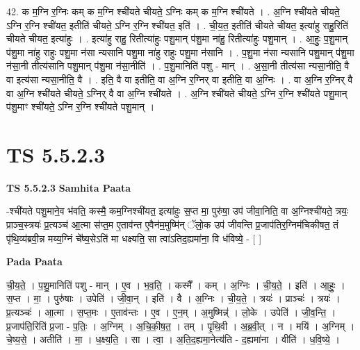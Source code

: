 \documentclass[17pt]{extarticle}
\begin{document}
42. क म॒ग्नि र॒ग्निः कम् क म॒ग्नि श्ची॑यते चीयते॒ ऽग्निः कम् क म॒ग्नि श्ची॑यते । . अ॒ग्नि श्ची॑यते चीयते॒ ऽग्नि र॒ग्नि श्ची॑यत॒ इतीति॑ चीयते॒ ऽग्नि र॒ग्नि श्ची॑यत॒ इति॑ । . ची॒य॒त॒ इतीति॑ चीयते चीयत॒ इत्या॑हु राहु॒रिति॑ चीयते चीयत॒ इत्या॑हुः । . इत्या॑हु राहु॒ रितीत्या॑हुः पशु॒मान् प॑शु॒मा ना॑हु॒ रितीत्या॑हुः पशु॒मान् । . आ॒हुः॒ प॒शु॒मान् प॑शु॒मा ना॑हु राहुः पशु॒मा न॑सा न्यसानि पशु॒मा ना॑हु राहुः पशु॒मा न॑सानि । . प॒शु॒मा न॑सा न्यसानि पशु॒मान् प॑शु॒मा न॑सा॒नी तीत्य॑सानि पशु॒मान् प॑शु॒मा न॑सा॒नीति॑ । . प॒शु॒मानिति॑ पशु - मान् । . अ॒सा॒नी तीत्य॑सा न्यसा॒नीति॒ वै वा इत्य॑सा न्यसा॒नीति॒ वै । . इति॒ वै वा इतीति॒ वा अ॒ग्नि र॒ग्निर् वा इतीति॒ वा अ॒ग्निः । . वा अ॒ग्नि र॒ग्निर् वै वा अ॒ग्नि श्ची॑यते चीयते॒ ऽग्निर् वै वा अ॒ग्नि श्ची॑यते । . अ॒ग्नि श्ची॑यते चीयते॒ ऽग्नि र॒ग्नि श्ची॑यते पशु॒मान् प॑शु॒माꣳ श्ची॑यते॒ ऽग्नि र॒ग्नि श्ची॑यते पशु॒मान् । \newline
\pagebreak
{}

\section{ TS 5.5.2.3 }

\textbf{TS 5.5.2.3 } \newline
\textbf{Samhita Paata} \newline

-श्ची॑यते पशु॒माने॒व भ॑वति॒ कस्मै॒ कम॒ग्निश्ची॑यत॒ इत्या॑हुः स॒प्त मा॒ पुरु॑षा॒ उप॑ जीवा॒निति॒ वा अ॒ग्निश्ची॑यते॒ त्रयः॒ प्राञ्च॒स्त्रयः॑ प्र॒त्यञ्च॑ आ॒त्मा स॑प्त॒म ए॒ताव॑न्त ए॒वैन॑म॒मुष्मि॑न् ॅलो॒क उप॑ जीवन्ति प्र॒जाप॑तिर॒ग्निम॑चिकीषत॒ तं पृ॑थि॒व्य॑ब्रवी॒न्न मय्य॒ग्निं चे᳚ष्य॒सेऽति॑ मा धक्ष्यति॒ सा त्वा॑ऽतिद॒ह्यमा॑ना॒ वि ध॑विष्ये॒ - [  ] \newline

\textbf{Pada Paata} \newline

ची॒य॒ते॒ । प॒शु॒मानिति॑ पशु - मान् । ए॒व । भ॒व॒ति॒ । कस्मै᳚ । कम् । अ॒ग्निः । ची॒य॒ते॒ । इति॑ । आ॒हुः॒ । स॒प्त । मा॒ । पुरु॑षाः । उपेति॑ । जी॒वा॒न् । इति॑ । वै । अ॒ग्निः । ची॒य॒ते॒ । त्रयः॑ । प्राञ्चः॑ । त्रयः॑ । प्र॒त्यञ्चः॑ । आ॒त्मा । स॒प्त॒मः । ए॒ताव॑न्तः । ए॒व । ए॒न॒म् । अ॒मुष्मिन्न्॑ । लो॒के । उपेति॑ । जी॒व॒न्ति॒ । प्र॒जाप॑ति॒रिति॑ प्र॒जा - प॒तिः॒ । अ॒ग्निम् । अ॒चि॒की॒ष॒त॒ । तम् । पृ॒थि॒वी । अ॒ब्र॒वी॒त् । न । मयि॑ । अ॒ग्निम् । चे॒ष्य॒से॒ । अतीति॑ । मा॒ । ध॒क्ष्य॒ति॒ । सा । त्वा॒ । अ॒ति॒द॒ह्यमा॒नेत्य॑ति - द॒ह्यमा॑ना । वीति॑ । ध॒वि॒ष्ये॒ ।  \newline
\end{document}
